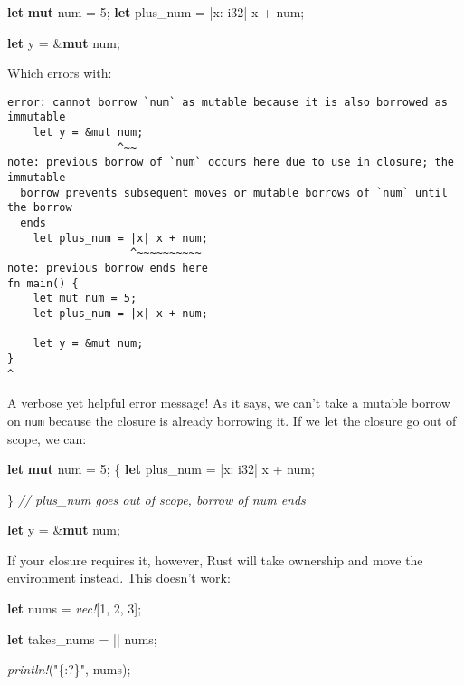 \documentclass[a4paper,]{book}
\newenvironment{Shaded}{\begin{snugshade}}{\end{snugshade}}
\newcommand{\KeywordTok}[1]{\textcolor[rgb]{0.13,0.29,0.53}{\textbf{{#1}}}}
\newcommand{\DataTypeTok}[1]{\textcolor[rgb]{0.13,0.29,0.53}{{#1}}}
\newcommand{\DecValTok}[1]{\textcolor[rgb]{0.00,0.00,0.81}{{#1}}}
\newcommand{\StringTok}[1]{\textcolor[rgb]{0.31,0.60,0.02}{{#1}}}
\newcommand{\CommentTok}[1]{\textcolor[rgb]{0.56,0.35,0.01}{\textit{{#1}}}}
\newcommand{\PreprocessorTok}[1]{\textcolor[rgb]{0.56,0.35,0.01}{\textit{{#1}}}}
\newcommand{\NormalTok}[1]{{#1}}
\begin{document}
\begin{Shaded}
\begin{Highlighting}[]
\KeywordTok{let} \KeywordTok{mut} \NormalTok{num = }\DecValTok{5}\NormalTok{;}
\KeywordTok{let} \NormalTok{plus_num = |x: }\DataTypeTok{i32}\NormalTok{| x + num;}

\KeywordTok{let} \NormalTok{y = &}\KeywordTok{mut} \NormalTok{num;}
\end{Highlighting}
\end{Shaded}

Which errors with:

\begin{verbatim}
error: cannot borrow `num` as mutable because it is also borrowed as immutable
    let y = &mut num;
                 ^~~
note: previous borrow of `num` occurs here due to use in closure; the immutable
  borrow prevents subsequent moves or mutable borrows of `num` until the borrow
  ends
    let plus_num = |x| x + num;
                   ^~~~~~~~~~~
note: previous borrow ends here
fn main() {
    let mut num = 5;
    let plus_num = |x| x + num;

    let y = &mut num;
}
^
\end{verbatim}

A verbose yet helpful error message! As it says, we can't take a mutable
borrow on \texttt{num} because the closure is already borrowing it. If
we let the closure go out of scope, we can:

\begin{Shaded}
\begin{Highlighting}[]
\KeywordTok{let} \KeywordTok{mut} \NormalTok{num = }\DecValTok{5}\NormalTok{;}
\NormalTok{\{}
    \KeywordTok{let} \NormalTok{plus_num = |x: }\DataTypeTok{i32}\NormalTok{| x + num;}

\NormalTok{\} }\CommentTok{// plus_num goes out of scope, borrow of num ends}

\KeywordTok{let} \NormalTok{y = &}\KeywordTok{mut} \NormalTok{num;}
\end{Highlighting}
\end{Shaded}

If your closure requires it, however, Rust will take ownership and move
the environment instead. This doesn't work:

\begin{Shaded}
\begin{Highlighting}[]
\KeywordTok{let} \NormalTok{nums = }\PreprocessorTok{vec!}\NormalTok{[}\DecValTok{1}\NormalTok{, }\DecValTok{2}\NormalTok{, }\DecValTok{3}\NormalTok{];}

\KeywordTok{let} \NormalTok{takes_nums = || nums;}

\PreprocessorTok{println!}\NormalTok{(}\StringTok{"\{:?\}"}\NormalTok{, nums);}
\end{Highlighting}
\end{Shaded}
\end{document}
